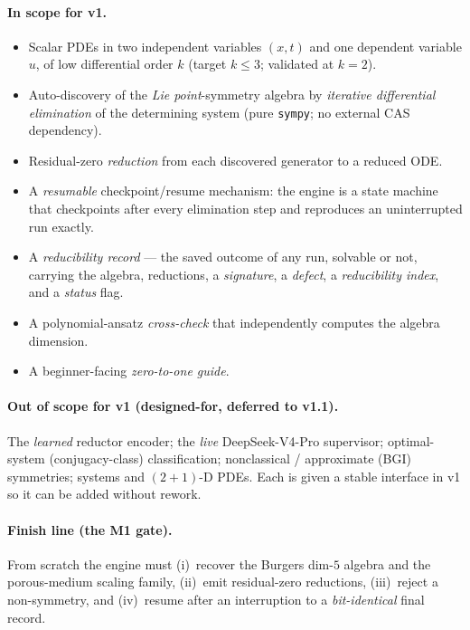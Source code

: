 \documentclass[11pt]{article}
\theoremstyle{definition}
\theoremstyle{remark}
\begin{document}
\paragraph{In scope for v1.}
\begin{itemize}[nosep]
  \item Scalar PDEs in two independent variables $(x,t)$ and one dependent variable $u$, of low
        differential order $k$ (target $k\le 3$; validated at $k=2$).
  \item Auto-discovery of the \emph{Lie point}-symmetry algebra by \emph{iterative differential
        elimination} of the determining system (pure \texttt{sympy}; no external CAS dependency).
  \item Residual-zero \emph{reduction} from each discovered generator to a reduced ODE.
  \item A \emph{resumable} checkpoint/resume mechanism: the engine is a state machine that
        checkpoints after every elimination step and reproduces an uninterrupted run exactly.
  \item A \emph{reducibility record} --- the saved outcome of any run, solvable or not, carrying the
        algebra, reductions, a \emph{signature}, a \emph{defect}, a \emph{reducibility index}, and a
        \emph{status} flag.
  \item A polynomial-ansatz \emph{cross-check} that independently computes the algebra dimension.
  \item A beginner-facing \emph{zero-to-one guide}.
\end{itemize}

\paragraph{Out of scope for v1 (designed-for, deferred to v1.1).}
The \emph{learned} reductor encoder; the \emph{live} DeepSeek-V4-Pro supervisor; optimal-system
(conjugacy-class) classification; nonclassical / approximate (BGI) symmetries; systems and
$(2{+}1)$-D PDEs. Each is given a stable interface in v1 so it can be added without rework.

\paragraph{Finish line (the M1 gate).} From scratch the engine must (i)~recover the Burgers dim-$5$
algebra and the porous-medium scaling family, (ii)~emit residual-zero reductions, (iii)~reject a
non-symmetry, and (iv)~resume after an interruption to a \emph{bit-identical} final record.
\end{document}
